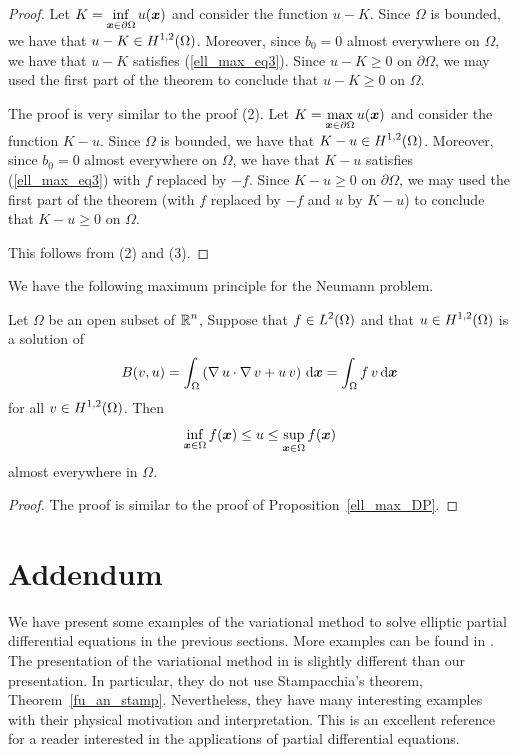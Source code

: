 \begin{proof}
 Let $\displaystyle K = \inf_{{\bm{x}}\in \partial \Omega} u({\bm{x}})$ and
consider the function $u-K$.  Since $\Omega$ is bounded, we have that
$\displaystyle u-K \in H^{1,2}(\Omega)$.  Moreover, since $b_0 = 0$ almost
everywhere on $\Omega$, we have that $u-K$ satisfies
(\ref{ell_max_eq3}).  Since $u-K\geq 0$ on $\partial \Omega$, we may
used the first part of the theorem to conclude that $u-K\geq 0$ on
$\Omega$.

 The proof is very similar to the proof (2). Let
$\displaystyle K = \max_{{\bm{x}}\in \partial \Omega} u({\bm{x}})$ and
consider the function $K-u$.  Since $\Omega$ is bounded, we have that
$\displaystyle K-u \in H^{1,2}(\Omega)$.  Moreover, since $b_0 = 0$ almost
everywhere on $\Omega$, we have that $K-u$ satisfies
(\ref{ell_max_eq3}) with $f$ replaced by $-f$.  Since
$K-u\geq 0$ on $\partial \Omega$, we may
used the first part of the theorem (with $f$ replaced by $-f$ and $u$
by $K-u$) to conclude that $K-u\geq 0$ on $\Omega$.

 This follows from (2) and (3).
\end{proof}

We have the following maximum principle for the Neumann problem.

\begin{prop} \label{ell_max_NP}
Let $\Omega$ be an open subset of $\displaystyle \mathbb{R}^n$,  Suppose that
$\displaystyle f\in L^2(\Omega)$ and that $\displaystyle u\in H^{1,2}(\Omega)$
is a solution of 
\[
B(v,u) =
\int_\Omega \left( \operatorname{\nabla} u \cdot \operatorname{\nabla} v +
u\,v \right) \,\mathrm{d}{{\bm{x}}} = \int_\Omega f\,v \,\mathrm{d}{{\bm{x}}}
\]
for all $\displaystyle v \in H^{1,2}(\Omega)$.  Then
\[
\inf_{{\bm{x}}\in \Omega} f({\bm{x}}) \leq u \leq
\sup_{{\bm{x}}\in \Omega} f({\bm{x}})
\]
almost everywhere in $\Omega$.
\end{prop}

\begin{proof}
The proof is similar to the proof of Proposition~\ref{ell_max_DP}.
\end{proof}

\section{Addendum}

We have present some examples of the variational method to solve
elliptic partial differential equations in the previous sections.
More examples can be found in \cite{Br,Sal}.  The presentation of the
variational method in \cite{Sal} is slightly different than our
presentation.  In particular, they do not use Stampacchia's theorem,
Theorem~\ref{fu_an_stamp}.  Nevertheless, they have many interesting
examples with their physical motivation and interpretation.  This is
an excellent reference for a reader interested in the applications of
partial differential equations.

